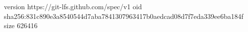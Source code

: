 version https://git-lfs.github.com/spec/v1
oid sha256:831c890e3a8540544d7aba7841307963417b0aedcad08d7f7eda339ee6ba184f
size 626416
